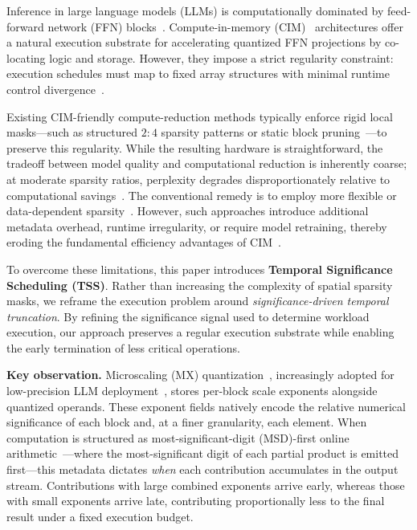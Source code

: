 \documentclass[sigconf]{acmart}
\begin{document}
Inference in large language models (LLMs) is computationally dominated by feed-forward network (FFN) blocks~\cite{samsi2023words,lo2015roofline}. Compute-in-memory (CIM)~\cite{fujiwara20225,yu2021compute} architectures offer a natural execution substrate for accelerating quantized FFN projections by co-locating logic and storage. However, they impose a strict regularity constraint: execution schedules must map to fixed array structures with minimal runtime control divergence~\cite{jeong2023vegeta,mishra2021accelerating,ramachandran2025accelerating}.

Existing CIM-friendly compute-reduction methods typically enforce rigid local masks---such as structured $2{:}4$ sparsity patterns or static block pruning~\cite{10904702,9768124}---to preserve this regularity. While the resulting hardware is straightforward, the tradeoff between model quality and computational reduction is inherently coarse; at moderate sparsity ratios, perplexity degrades disproportionately relative to computational savings~\cite{harma2024effective,frantar2023sparsegpt}. The conventional remedy is to employ more flexible or data-dependent sparsity~\cite{jeong2023vegeta,mishra2021accelerating}. However, such approaches introduce additional metadata overhead, runtime irregularity, or require model retraining, thereby eroding the fundamental efficiency advantages of CIM~\cite{ramachandran2025accelerating}.

To overcome these limitations, this paper introduces \textbf{Temporal Significance Scheduling (TSS)}. Rather than increasing the complexity of spatial sparsity masks, we reframe the execution problem around \emph{significance-driven temporal truncation}. By refining the significance signal used to determine workload execution, our approach preserves a regular execution substrate while enabling the early termination of less critical operations. 

\textbf{Key observation.} Microscaling (MX) quantization~\cite{rouhani2023ocp}, increasingly adopted for low-precision LLM deployment~\cite{wang2025infir2,mishra2025recipes}, stores per-block scale exponents alongside quantized operands. These exponent fields natively encode the relative numerical significance of each block and, at a finer granularity, each element. When computation is structured as most-significant-digit (MSD)-first online arithmetic~\cite{villalba2011radix,huang2001fpga,zhao2016efficient}---where the most-significant digit of each partial product is emitted first---this metadata dictates \emph{when} each contribution accumulates in the output stream. Contributions with large combined exponents arrive early, whereas those with small exponents arrive late, contributing proportionally less to the final result under a fixed execution budget.
\end{document}

